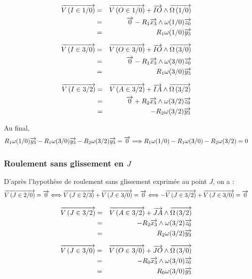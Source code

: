 \documentclass[10pt,oneside]{article}
\begin{document}
\begin{minipage}[c]{.3\linewidth}
\begin{eqnarray*}
\vectv{I}{1}{0} &=& \vectv{O}{1}{0} + \vect{IO} \wedge \vecto{1}{0} \\
&=& \vect{0} -R_1\vect{x_3}\wedge\omega(1/0)\vect{z_0} \\
& = & R_1 \omega(1/0)\vect{y_3} 
\end{eqnarray*}
\end{minipage}\hfill
\begin{minipage}[c]{.3\linewidth}
\begin{eqnarray*}
\vectv{I}{3}{0} &=& \vectv{O}{3}{0} + \vect{IO} \wedge \vecto{3}{0} \\
&= &\vect{0} -R_1\vect{x_3}\wedge\omega(3/0)\vect{z_0} \\
&= & R_1 \omega(3/0)\vect{y_3} 
\end{eqnarray*}
\end{minipage}\hfill
\begin{minipage}[c]{.3\linewidth}
\begin{eqnarray*}
\vectv{I}{3}{2} &=& \vectv{A}{3}{2} + \vect{IA} \wedge \vecto{3}{2} \\
&=& \vect{0} + R_2\vect{x_3}\wedge\omega(3/2)\vect{z_0} \\
& = & -R_2 \omega(3/2)\vect{y_3} 
\end{eqnarray*}
\end{minipage}

\vspace{.25cm}

Au final, 
$$
R_1 \omega(1/0)\vect{y_3}  -R_1 \omega(3/0)\vect{y_3}  -R_2 \omega(3/2)\vect{y_3} = \vect{0}
\Longrightarrow
R_1 \omega(1/0) -R_1 \omega(3/0)  -R_2 \omega(3/2) = 0
$$

\subsubsection{Roulement sans glissement en $J$}
D'après l'hypothèse de roulement sans glissement exprimée au point $J$, on a : 
$$
\vectv{J}{2}{0} = \vect{0}
\Longleftrightarrow 
\vectv{J}{2}{3} + \vectv{J}{3}{0}= \vect{0}
\Longleftrightarrow 
-\vectv{J}{3}{2} + \vectv{J}{3}{0}= \vect{0}
$$

\begin{minipage}[c]{.45\linewidth}
\begin{eqnarray*}
\vectv{J}{3}{2} &=& \vectv{A}{3}{2} + \vect{JA}\wedge\vecto{3}{2} \\
& = & -R_2\vect{x_3} \wedge \omega(3/2)\vect{z_0}\\
& = & R_2 \omega(3/2)\vect{y_3}
\end{eqnarray*}
\end{minipage}\hfill
\begin{minipage}[c]{.45\linewidth}
\begin{eqnarray*}
\vectv{J}{3}{0} &=& \vectv{O}{3}{0} + \vect{JO}\wedge\vecto{3}{0} \\
& = & -R_0\vect{x_3} \wedge \omega(3/0)\vect{z_0} \\
& = & R_0 \omega(3/0)\vect{y_3}
\end{eqnarray*}
\end{minipage}
\end{document}
